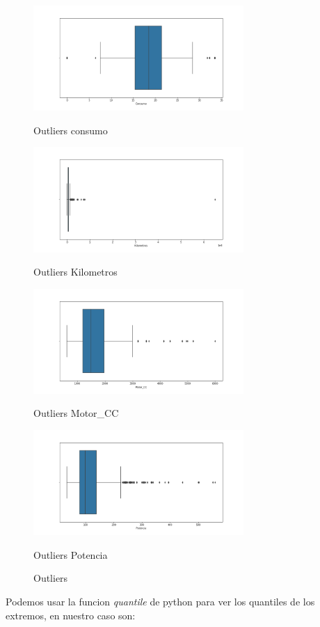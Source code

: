 \documentclass[12pt,twoside]{report}
\begin{document}
\begin{figure}[H]
\begin{multicols}{2}
\includegraphics[width=8cm]{../notebooks/figures/outlier_Consumo.png}
\caption{Outliers consumo}
\columnbreak
\includegraphics[width=8cm]{../notebooks/figures/outlier_Kilometros.png}
\caption{Outliers Kilometros}
\end{multicols}
\begin{multicols}{2}
\includegraphics[width=8cm]{../notebooks/figures/outlier_Motor_CC.png}
\caption{Outliers Motor\_CC}
\columnbreak
\includegraphics[width=8cm]{../notebooks/figures/outlier_Potencia.png}
\caption{Outliers Potencia}
\end{multicols}
\caption{Outliers}
\label{fig:outliers_data}
\end{figure} 

Podemos usar la funcion \textit{quantile} de python para ver los quantiles de los extremos, en nuestro caso son:
\end{document}
